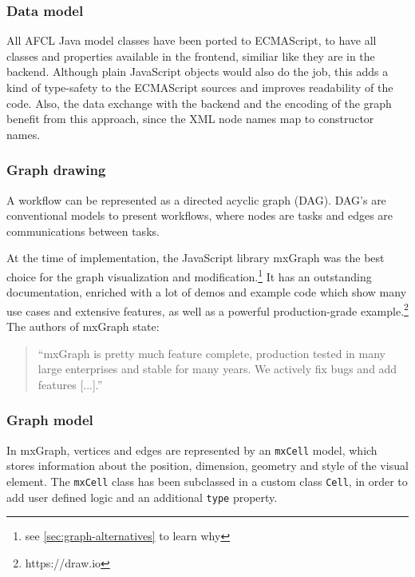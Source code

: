 \documentclass[a4paper,top=25mm,bottom=25mm,12pt,pdftex,halfparskip,twoside,bibtotoc,numbers=noenddot]{scrbook}
\begin{document}
\subsubsection{Data model}

All AFCL Java model classes have been ported to ECMAScript, to have all classes and properties available in the frontend, similiar like they are in the backend. Although plain JavaScript objects would also do the job, this adds a kind of type-safety to the ECMAScript sources and improves readability of the code. Also, the data exchange with the backend and the encoding of the graph benefit from this approach, since the XML node names map to constructor names.

\subsubsection{Graph drawing}

A workflow can be represented as a directed acyclic graph (DAG). DAG's are conventional models to present workflows, where nodes are tasks and edges are communications between tasks.

At the time of implementation, the JavaScript library mxGraph was the best choice for the graph visualization and modification.\footnote{see \ref{sec:graph-alternatives} to learn why}
It has an outstanding documentation, enriched with a lot of demos and example code which show many use cases and extensive features, as well as a powerful production-grade example.\footnote{https://draw.io}\\
The authors of mxGraph state:\\
\begin{quote}
``mxGraph is pretty much feature complete, production tested in many large enterprises and stable for many years. We actively fix bugs and add features [...].''
\end{quote}

\subsubsection{Graph model}

In mxGraph, vertices and edges are represented by an \texttt{mxCell} model, which stores information about the position, dimension, geometry and style of the visual element. The \texttt{mxCell} class has been subclassed in a custom class \texttt{Cell}, in order to add user defined logic and an additional \texttt{type} property.
\end{document}
